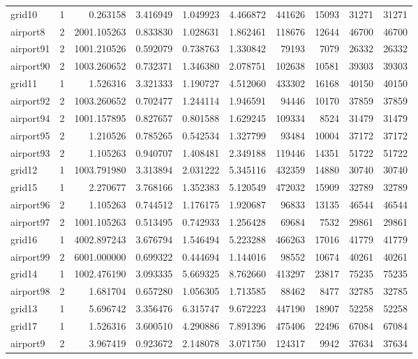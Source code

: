 \begin{longtable}{|l|r|r|r|r|r|r|r|r|r|}
grid10 & 1 & 0.263158 & 3.416949 & 1.049923 & 4.466872 & 441626 & 15093 & 31271 & 31271 \\
airport8 & 2 & 2001.105263 & 0.833830 & 1.028631 & 1.862461 & 118676 & 12644 & 46700 & 46700 \\
airport91 & 2 & 1001.210526 & 0.592079 & 0.738763 & 1.330842 & 79193 & 7079 & 26332 & 26332 \\
airport90 & 2 & 1003.260652 & 0.732371 & 1.346380 & 2.078751 & 102638 & 10581 & 39303 & 39303 \\
grid11 & 1 & 1.526316 & 3.321333 & 1.190727 & 4.512060 & 433302 & 16168 & 40150 & 40150 \\
airport92 & 2 & 1003.260652 & 0.702477 & 1.244114 & 1.946591 & 94446 & 10170 & 37859 & 37859 \\
airport94 & 2 & 1001.157895 & 0.827657 & 0.801588 & 1.629245 & 109334 & 8524 & 31479 & 31479 \\
airport95 & 2 & 1.210526 & 0.785265 & 0.542534 & 1.327799 & 93484 & 10004 & 37172 & 37172 \\
airport93 & 2 & 1.105263 & 0.940707 & 1.408481 & 2.349188 & 119446 & 14351 & 51722 & 51722 \\
grid12 & 1 & 1003.791980 & 3.313894 & 2.031222 & 5.345116 & 432359 & 14880 & 30740 & 30740 \\
grid15 & 1 & 2.270677 & 3.768166 & 1.352383 & 5.120549 & 472032 & 15909 & 32789 & 32789 \\
airport96 & 2 & 1.105263 & 0.744512 & 1.176175 & 1.920687 & 96833 & 13135 & 46544 & 46544 \\
airport97 & 2 & 1001.105263 & 0.513495 & 0.742933 & 1.256428 & 69684 & 7532 & 29861 & 29861 \\
grid16 & 1 & 4002.897243 & 3.676794 & 1.546494 & 5.223288 & 466263 & 17016 & 41779 & 41779 \\
airport99 & 2 & 6001.000000 & 0.699322 & 0.444694 & 1.144016 & 98552 & 10674 & 40261 & 40261 \\
grid14 & 1 & 1002.476190 & 3.093335 & 5.669325 & 8.762660 & 413297 & 23817 & 75235 & 75235 \\
airport98 & 2 & 1.681704 & 0.657280 & 1.056305 & 1.713585 & 88462 & 8477 & 32785 & 32785 \\
grid13 & 1 & 5.696742 & 3.356476 & 6.315747 & 9.672223 & 447190 & 18907 & 52258 & 52258 \\
grid17 & 1 & 1.526316 & 3.600510 & 4.290886 & 7.891396 & 475406 & 22496 & 67084 & 67084 \\
airport9 & 2 & 3.967419 & 0.923672 & 2.148078 & 3.071750 & 124317 & 9942 & 37634 & 37634 \\

\end{longtable}
